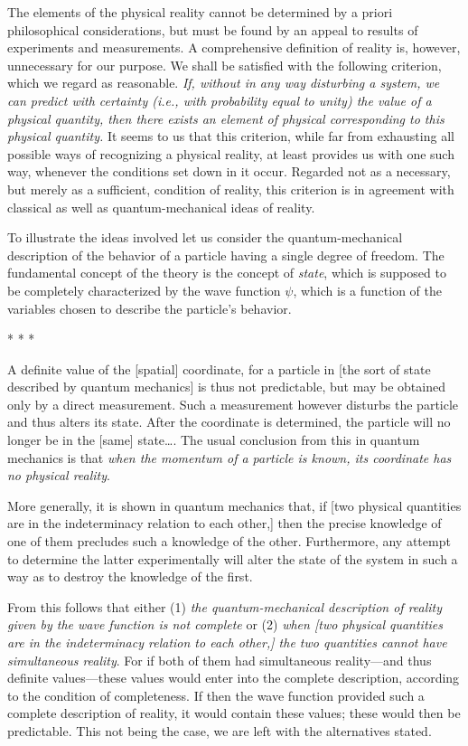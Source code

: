 The elements of the physical reality cannot be determined by a priori
philosophical considerations, but must be found by an appeal to results
of experiments and measurements. A comprehensive definition of reality
is, however, unnecessary for our purpose. We shall be satisfied with the
following criterion, which we regard as reasonable. \emph{If, without in
any way disturbing a system, we can predict with certainty (i.e.,
with probability equal to unity) the value of a physical
quantity, then there exists an element of physical
corresponding to this physical quantity.} It seems to us that this
criterion, while far from exhausting all possible ways of recognizing a
physical reality, at least provides us with one such way, whenever the
conditions set down in it occur. Regarded not as a necessary, but merely
as a sufficient, condition of reality, this criterion is in agreement
with classical as well as quantum-mechanical ideas of reality.

To illustrate the ideas involved let us consider the quantum-mechanical
description of the behavior of a particle having a single degree of
freedom. The fundamental concept of the theory is the concept of
\emph{state}, which is supposed to be completely characterized by the
wave function $\psi$, which is a function of the variables chosen to
describe the particle's behavior.\\
\centerline{* * *}
%
A definite value of the [spatial] coordinate, for a particle in [the sort of state
described by quantum mechanics] is thus not predictable, but may be obtained
only by a direct measurement. Such a measurement however disturbs the
particle and thus alters its state. After the coordinate is determined,
the particle will no longer be in the {[}same{]} state\ldots. The usual
conclusion from this in quantum mechanics is that \emph{when the
momentum of a particle is known, its coordinate has no physical
reality}.

More generally, it is shown in quantum mechanics that, if {[}two
physical quantities are in the indeterminacy relation to each other,{]}
then the precise knowledge of one of them precludes such a knowledge of
the other. Furthermore, any attempt to determine the latter
experimentally will alter the state of the system in such a way as to
destroy the knowledge of the first.

From this follows that either (1) \emph{the quantum-mechanical
description of reality given by the wave function is not complete} or
(2) \emph{when {[}two physical quantities are in the indeterminacy
relation to each other,{]} the two quantities cannot have simultaneous
reality}. For if both of them had simultaneous reality---and thus
definite values---these values would enter into the complete
description, according to the condition of completeness. If then the
wave function provided such a complete description of reality, it would
contain these values; these would then be predictable. This not being
the case, we are left with the alternatives stated.

